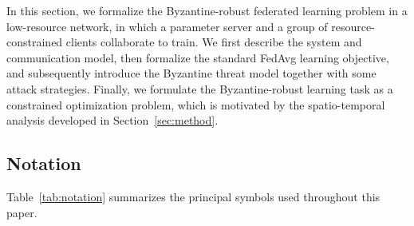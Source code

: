 \documentclass[journal]{IEEEtran}
\begin{document}
In this section, we formalize the Byzantine-robust federated learning problem in a low-resource network, in which a parameter server and a group of resource-constrained clients collaborate to train. We first describe the system and communication model, then formalize the standard FedAvg learning objective, and subsequently introduce the Byzantine threat model together with some attack strategies. Finally, we formulate the Byzantine-robust learning task as a constrained optimization problem, which is motivated by the spatio-temporal analysis developed in Section~\ref{sec:method}.

\subsection{Notation}

Table~\ref{tab:notation} summarizes the principal symbols used throughout this paper.
\end{document}
